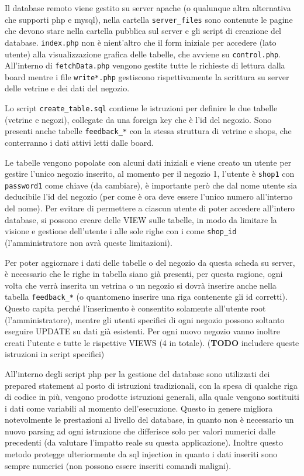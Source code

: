 Il database remoto viene gestito su server apache (o qualunque altra alternativa che supporti php e mysql), nella cartella \texttt{server\_files} sono contenute le pagine che devono stare nella cartella pubblica sul server e gli script di creazione del database. \texttt{index.php} non \`e nient'altro che il form iniziale per accedere (lato utente) alla visualizzazione grafica delle tabelle, che avviene su \texttt{control.php}. All'interno di \texttt{fetchData.php} vengono gestite tutte le richieste di lettura dalla board mentre i file \texttt{write*.php} gestiscono rispettivamente la scrittura su server delle vetrine e dei dati del negozio.

Lo script \texttt{create\_table.sql} contiene le istruzioni per definire le due tabelle (vetrine e negozi), collegate da una foreign key che \`e l'id del negozio. Sono presenti anche tabelle \texttt{feedback\_*} con la stessa struttura di vetrine e shops, che conterranno i dati attivi letti dalle board.

Le tabelle vengono popolate con alcuni dati iniziali e viene creato un utente per gestire l'unico negozio inserito, al momento per il negozio 1, l'utente \`e \texttt{shop1} con \texttt{password1} come chiave (da cambiare), \`e importante per\`o che dal nome utente sia deducibile l'id del negozio (per come \`e ora deve essere l'unico numero all'interno del nome). Per evitare di permettere a ciascun utente di poter accedere all'intero database, si possono creare delle VIEW sulle tabelle, in modo da limitare la visione e gestione dell'utente i alle sole righe con i come \texttt{shop\_id} (l'amministratore non avr\`a queste limitazioni).

Per poter aggiornare i dati delle tabelle o del negozio da questa scheda su server, \`e necessario che le righe in tabella siano gi\`a presenti, per questa ragione, ogni volta che verr\`a inserita un vetrina o un negozio si dovr\`a inserire anche nella tabella \texttt{feedback\_*} (o quantomeno inserire una riga contenente gli id corretti). Questo capita perch\'e l'inserimento \`e consentito solamente all'utente root (l'amministratore), mentre gli utenti specifici di ogni negozio possono soltanto eseguire UPDATE su dati gi\`a esistenti. Per ogni nuovo negozio vanno inoltre creati l'utente e tutte le rispettive VIEWS (4 in totale). (\textbf{TODO} includere queste istruzioni in script specifici) 

All'interno degli script php per la gestione del database sono utilizzati dei prepared statement al posto di istruzioni tradizionali, con la spesa di qualche riga di codice in pi\`u, vengono prodotte istruzioni generali, alla quale vengono sostituiti i dati come variabili al momento dell'esecuzione. Questo in genere migliora notevolmente le prestazioni al livello del database, in quanto non \`e necessario un nuovo parsing ad ogni istruzione che differisce solo per valori numerici dalle precedenti (da valutare l'impatto reale su questa applicazione). Inoltre questo metodo protegge ulteriormente da sql injection in quanto i dati inseriti sono sempre numerici (non possono essere inseriti comandi maligni).

